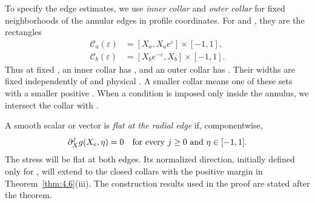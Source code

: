 To specify the edge estimates, we use \emph{inner collar} and \emph{outer collar} for fixed neighborhoods of the annular edges in profile coordinates. For  and , they are the rectangles
\begin{equation}
\begin{aligned}
  \mathcal{C}_a(\varepsilon)&=[X_a,X_ae^\varepsilon]\times[-1,1],\\
  \mathcal{C}_b(\varepsilon)&=[X_be^{-\varepsilon},X_b]\times[-1,1].
\end{aligned}
\tag{4.24}\label{eq:4.24}
\end{equation}
Thus at fixed , an inner collar has , and an outer collar has . Their widths are fixed independently of  and physical . A smaller collar means one of these sets with a smaller positive . When a condition is imposed only inside the annulus, we intersect the collar with .

A smooth scalar or vector  is \emph{flat at the radial edge}  if, componentwise,
\[
  \partial_X^jg(X_e,\eta)=0\quad\hbox{for every }j\geq0\hbox{ and }\eta\in[-1,1].
\]
The stress will be flat at both edges. Its normalized direction, initially defined only for , will extend to the closed collars with the positive margin in Theorem~\ref{thm:4.6}(iii). The construction results used in the proof are stated after the theorem.

